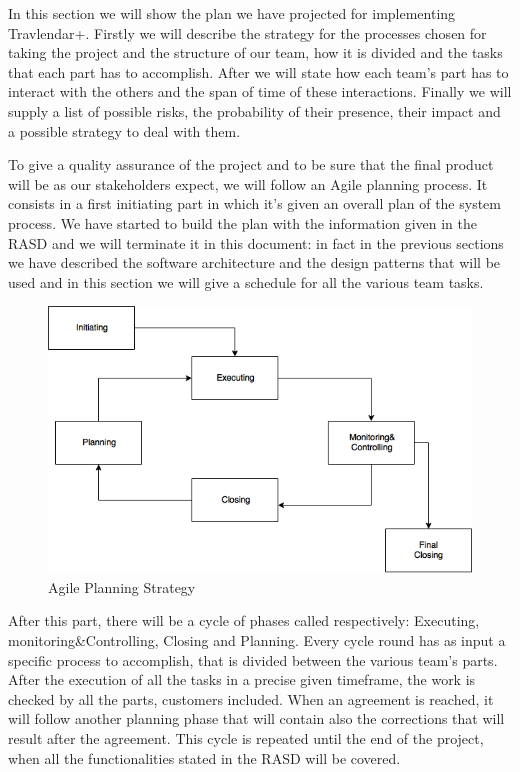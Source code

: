 In this section we will show the plan we have projected for implementing Travlendar+. 
Firstly we will describe the strategy for the processes chosen for taking the project and the structure of our team, how it is divided and the tasks that each part has to accomplish.
After we will state how each team’s part has to interact with the others and the span of time of these interactions. 
Finally we will supply a list of possible risks, the probability of their presence, their impact and a possible strategy to deal with them.

To give a quality assurance of the project and to be sure that the final product will be as our stakeholders expect, we will follow an Agile planning process. It consists in a first initiating part in which it’s given an overall plan of the system process. We have started to build the plan with the information given in the RASD and we will terminate it in this document: in fact in the previous sections we have described the software architecture and the design patterns that will be used and in this section we will give a schedule for all the various team tasks.
\begin{figure}[H]
	\centering
	\includegraphics[scale=0.35]{Images/Implementation/Agile_Planning}
	\caption{Agile Planning Strategy}
\end{figure}
After this part, there will be a cycle of phases called respectively: Executing, monitoring\&Controlling, Closing and Planning. 
Every cycle round has as input a specific process to accomplish, that is divided between the various team’s parts. After the execution of all the tasks in a precise given timeframe, the work is checked by all the parts, customers included. When an agreement is reached, it will follow another planning phase that will contain also the corrections that will result after the agreement.
This cycle is repeated until the end of the project, when all the functionalities stated in the RASD will be covered.

